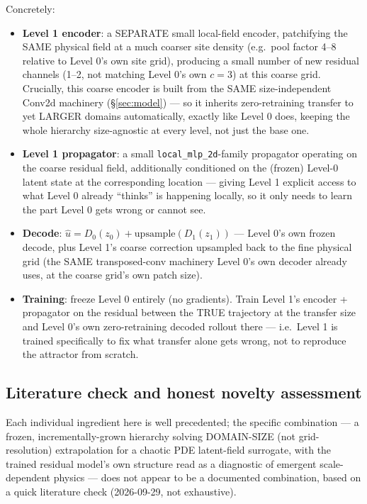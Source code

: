 \documentclass[11pt]{article}
\begin{document}
Concretely:
\begin{itemize}[nosep]
\item \textbf{Level 1 encoder}: a SEPARATE small local-field encoder,
  patchifying the SAME physical field at a much coarser site density
  (e.g.\ pool factor 4--8 relative to Level 0's own site grid), producing
  a small number of new residual channels (1--2, not matching Level 0's
  own $c{=}3$) at this coarse grid. Crucially, this coarse encoder is
  built from the SAME size-independent Conv2d machinery
  (\S\ref{sec:model}) --- so it inherits zero-retraining transfer to yet
  LARGER domains automatically, exactly like Level 0 does, keeping the
  whole hierarchy size-agnostic at every level, not just the base one.
\item \textbf{Level 1 propagator}: a small \texttt{local\_mlp\_2d}-family
  propagator operating on the coarse residual field, additionally
  conditioned on the (frozen) Level-0 latent state at the corresponding
  location --- giving Level 1 explicit access to what Level 0 already
  ``thinks'' is happening locally, so it only needs to learn the part
  Level 0 gets wrong or cannot see.
\item \textbf{Decode}: $\hat u = D_0(z_0) + \mathrm{upsample}(D_1(z_1))$
  --- Level 0's own frozen decode, plus Level 1's coarse correction
  upsampled back to the fine physical grid (the SAME transposed-conv
  machinery Level 0's own decoder already uses, at the coarse grid's own
  patch size).
\item \textbf{Training}: freeze Level 0 entirely (no gradients). Train
  Level 1's encoder + propagator on the residual between the TRUE
  trajectory at the transfer size and Level 0's own zero-retraining
  decoded rollout there --- i.e.\ Level 1 is trained specifically to fix
  what transfer alone gets wrong, not to reproduce the attractor from
  scratch.
\end{itemize}

\subsection{Literature check and honest novelty assessment}
\label{sec:lit_residual}

Each individual ingredient here is well precedented; the specific
combination --- a frozen, incrementally-grown hierarchy solving DOMAIN-SIZE
(not grid-resolution) extrapolation for a chaotic PDE latent-field
surrogate, with the trained residual model's own structure read as a
diagnostic of emergent scale-dependent physics --- does not appear to
be a documented combination, based on a quick literature check (2026-09-29,
not exhaustive).
\end{document}
